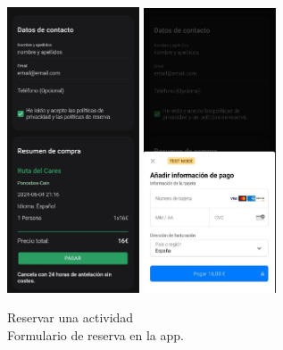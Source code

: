 \begin{figure}[H]
	\centering
	\begin{minipage}{0.45\textwidth}
		\centering
		\includegraphics[width=0.35\textwidth]{7-Construccion/Manuales/app/P2-Reservar.png}
		\includegraphics[width=0.35\textwidth]{7-Construccion/Manuales/app/P3-Reservar.png}
		\caption{Reservar una actividad \\ Formulario de reserva en la app.}
		\label{fig:formulario-app-reservar}
	\end{minipage}
	\hfill
	\begin{minipage}{0.45\textwidth}
		\centering

\end{minipage}
\end{figure}
